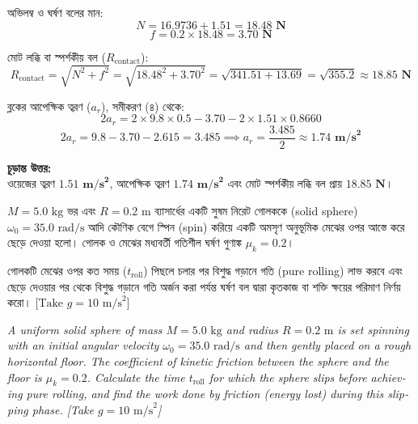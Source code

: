 \documentclass[12pt, a4paper]{article}
\begin{document}
\begin{tcolorbox}[solutionbox={সমাধান (Solution)}]
অভিলম্ব ও ঘর্ষণ বলের মান:
$$N = 16.9736 + 1.51 = \mathbf{18.48\text{ N}}$$ 
$$f = 0.2 \times 18.48 = \mathbf{3.70\text{ N}}$$

মোট লব্ধি বা স্পর্শকীয় বল ($R_{\text{contact}}$):
$$R_{\text{contact}} = \sqrt{N^2 + f^2} = \sqrt{18.48^2 + 3.70^2} = \sqrt{341.51 + 13.69} = \sqrt{355.2} \approx \mathbf{18.85\text{ N}}$$

ব্লকের আপেক্ষিক ত্বরণ ($a_r$), সমীকরণ (৪) থেকে:
$$2 a_r = 2 \times 9.8 \times 0.5 - 3.70 - 2 \times 1.51 \times 0.8660$$ 
$$2 a_r = 9.8 - 3.70 - 2.615 = 3.485 \implies a_r = \frac{3.485}{2} \approx \mathbf{1.74\text{ m/s}^2}$$

\vspace{1em}
\begin{tcolorbox}[answerbox]
\textbf{চূড়ান্ত উত্তর:} \\
ওয়েজের ত্বরণ $\mathbf{1.51\text{ m/s}^2}$, আপেক্ষিক ত্বরণ $\mathbf{1.74\text{ m/s}^2}$ এবং মোট স্পর্শকীয় লব্ধি বল প্রায় $\mathbf{18.85\text{ N}}$।
\end{tcolorbox}
\end{tcolorbox}

\begin{tcolorbox}[questionbox={প্রশ্ন(Question) 18}]
\noindent
$M = 5.0\text{ kg}$ ভর এবং $R = 0.2\text{ m}$ ব্যাসার্ধের একটি সুষম নিরেট গোলককে (solid sphere) $\omega_0 = 35.0\text{ rad/s}$ আদি কৌণিক বেগে স্পিন (spin) করিয়ে একটি অমসৃণ অনুভূমিক মেঝের ওপর আস্তে করে ছেড়ে দেওয়া হলো। গোলক ও মেঝের মধ্যবর্তী গতিশীল ঘর্ষণ গুণাঙ্ক $\mu_k = 0.2$। 

\vspace{0.3em}
\noindent
গোলকটি মেঝের ওপর কত সময় ($t_{\text{roll}}$) পিছলে চলার পর বিশুদ্ধ গড়ানে গতি (pure rolling) লাভ করবে এবং ছেড়ে দেওয়ার পর থেকে বিশুদ্ধ গড়ানে গতি অর্জন করা পর্যন্ত ঘর্ষণ বল দ্বারা কৃতকাজ বা শক্তি ক্ষয়ের পরিমাণ নির্ণয় করো। [$\text{Take } g = 10\text{ m/s}^2$]

\vspace{0.8em}
\begin{english}
\noindent\textit{\color{darkgray}
A uniform solid sphere of mass $M = 5.0\text{ kg}$ and radius $R = 0.2\text{ m}$ is set spinning with an initial angular velocity $\omega_0 = 35.0\text{ rad/s}$ and then gently placed on a rough horizontal floor. The coefficient of kinetic friction between the sphere and the floor is $\mu_k = 0.2$. Calculate the time $t_{\text{roll}}$ for which the sphere slips before achieving pure rolling, and find the work done by friction (energy lost) during this slipping phase. [Take $g = 10\text{ m/s}^2$]
}
\end{english}
\end{tcolorbox}
\end{document}
